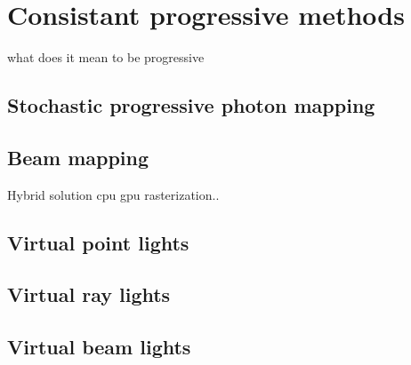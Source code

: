 \chapter{Consistant progressive methods}
what does it mean to be progressive
\section{Stochastic progressive photon mapping}
\cite{}

\section{Beam mapping}
\cite{jarosz11progressive}
Hybrid solution cpu gpu rasterization..
\section{Virtual point lights}
\cite{Keller97instantradiosity} %
\cite{HasanVSL} %
\section{Virtual ray lights}
\cite{novak12vrls}
\section{Virtual beam lights}
\cite{novak12vbls}




